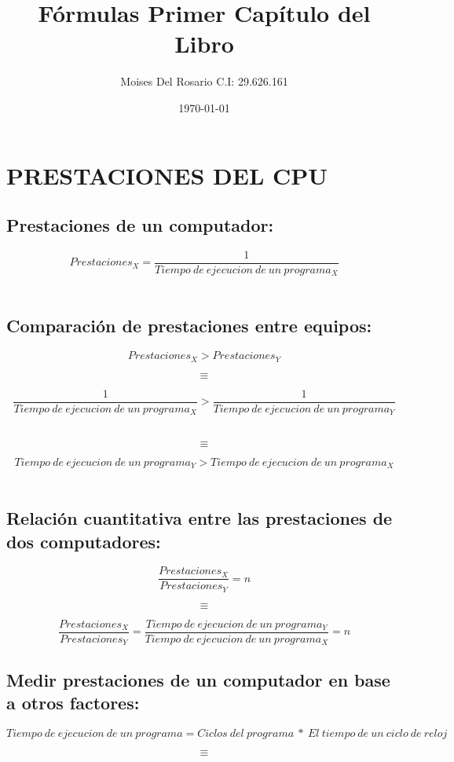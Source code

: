 \documentclass{article}
\title{Fórmulas Primer Capítulo del Libro}
\author{Moises Del Rosario C.I: 29.626.161}
\date{\today}
\begin{document}
\maketitle

\section{ \uppercase{Prestaciones del CPU} }

\subsection{Prestaciones de un computador:}

$$Prestaciones_{X} = \frac{1}{Tiempo\ de\ ejecucion\ de\ un\ programa_{X}}$$
\

\subsection{Comparación de prestaciones entre equipos:}

$$Prestaciones_{X} > Prestaciones_{Y}$$

$$\equiv$$

$$\frac{1}{Tiempo\ de\ ejecucion\ de\ un\ programa_{X}} > \frac{1}{Tiempo\ de\ ejecucion\ de\ un\ programa_{Y}}$$
\

$$\equiv$$

$$Tiempo\ de\ ejecucion\ de\ un\ programa_{Y} > Tiempo\ de\ ejecucion\ de\ un\ programa_{X}$$\

\subsection{Relación cuantitativa entre las prestaciones de dos computadores:}
$$\frac{Prestaciones_{X}}{Prestaciones_{Y}} = n$$

$$\equiv$$

$$\frac{Prestaciones_{X}}{Prestaciones_{Y}} = \frac{Tiempo\ de\ ejecucion\ de\ un\ programa_{Y}}{Tiempo\ de\ ejecucion\ de\ un\ programa_{X}} = n$$

\subsection{Medir prestaciones de un computador en base a otros factores:}

$$Tiempo\ de\ ejecucion\ de\ un\ programa = Ciclos\ del\ programa \ *\ El\ tiempo\ de\ un\ ciclo\ de\ reloj$$

$$\equiv$$
\end{document}
